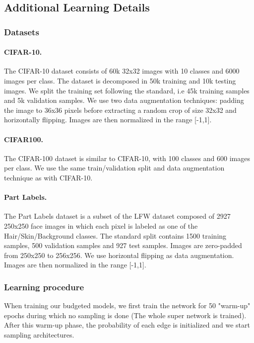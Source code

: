 \documentclass[10pt,twocolumn,letterpaper]{article}
\begin{document}
\newpage
\subsection*{Additional Learning Details}

\subsubsection*{Datasets}

\paragraph*{CIFAR-10.}
The CIFAR-10 dataset consists of 60k 32x32 images with 10 classes and 6000 images per class. The dataset is decomposed in 50k training and 10k testing images. We split the training set following the standard, i.e 45k training samples and 5k validation samples. We use two data augmentation techniques: padding the image to 36x36 pixels before extracting a random crop of size 32x32 and horizontally flipping. Images are then normalized in the range [-1,1].  

\paragraph*{CIFAR100.}
The CIFAR-100 dataset is similar to CIFAR-10, with 100 classes and 600 images per class. We use the same train/validation split and data augmentation technique as with CIFAR-10.  

\paragraph*{Part Labels.}
The Part Labels dataset is a subset of the LFW dataset composed of 2927 250x250 face images in which each pixel is labeled as one of the Hair/Skin/Background classes. The standard split contains 1500 training samples, 500 validation samples and 927 test samples. Images are zero-padded from 250x250 to 256x256. We use horizontal flipping as data augmentation. Images are then normalized in the range [-1,1].

\subsubsection*{Learning procedure}
When training our budgeted models, we first train the network for 50 "warm-up" epochs during which no sampling is done (The whole super network is trained). After this warm-up phase, the probability of each edge is initialized and we start sampling architectures.
\end{document}
